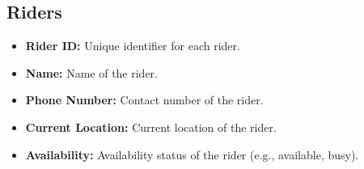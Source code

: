 \subsection{Riders}
\begin{itemize}
    \item \textbf{Rider ID:} Unique identifier for each rider.
    \item \textbf{Name:} Name of the rider.
    \item \textbf{Phone Number:} Contact number of the rider.
    \item \textbf{Current Location:} Current location of the rider.
    \item \textbf{Availability:} Availability status of the rider (e.g., available, busy).
\end{itemize}



